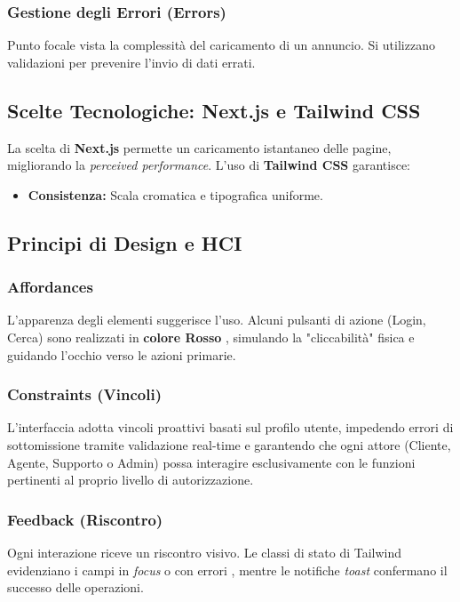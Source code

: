 \documentclass{article}
\begin{document}
\subsubsection{Gestione degli Errori (Errors)}
Punto focale vista la complessità del caricamento di un annuncio. Si utilizzano validazioni per prevenire l'invio di dati errati.


\subsection{Scelte Tecnologiche: Next.js e Tailwind CSS}
La scelta di \textbf{Next.js} permette un caricamento istantaneo delle pagine, migliorando la \textit{perceived performance}. L'uso di \textbf{Tailwind CSS} garantisce:
\begin{itemize}
    \item \textbf{Consistenza:} Scala cromatica e tipografica uniforme.
\end{itemize}

\subsection{Principi di Design e HCI}

\subsubsection{Affordances}
L'apparenza degli elementi suggerisce l'uso. Alcuni pulsanti di azione (Login, Cerca) sono realizzati in \textbf{colore Rosso} , simulando la "cliccabilità" fisica e guidando l'occhio verso le azioni primarie.

\subsubsection{Constraints (Vincoli)}
L’interfaccia adotta vincoli proattivi basati sul profilo utente, impedendo errori di sottomissione tramite validazione real-time e garantendo che ogni attore (Cliente, Agente, Supporto o Admin) possa interagire esclusivamente con le funzioni pertinenti al proprio livello di autorizzazione.

\subsubsection{Feedback (Riscontro)}
Ogni interazione riceve un riscontro visivo. Le classi di stato di Tailwind evidenziano i campi in \textit{focus} o con errori , mentre le notifiche \textit{toast} confermano il successo delle operazioni.
\end{document}
